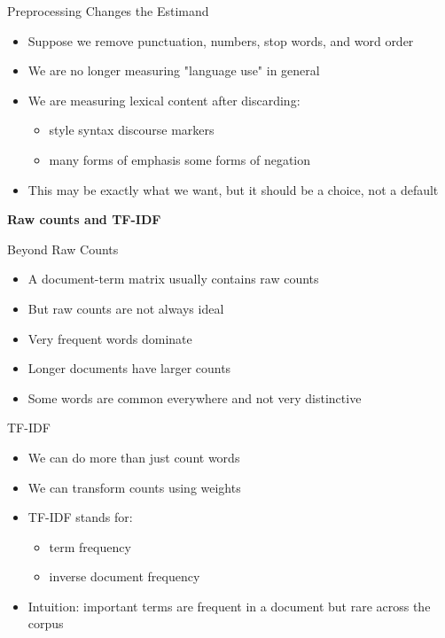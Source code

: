\documentclass[11pt,aspectratio=43]{beamer}
\begin{document}
\begin{frame}{Preprocessing Changes the Estimand}
\begin{itemize}
\item Suppose we remove punctuation, numbers, stop words, and word order
\item We are no longer measuring "language use" in general
\item We are measuring lexical content after discarding:
  \begin{itemize}
  \item style \quad syntax \quad discourse markers
  \item many forms of emphasis \quad some forms of negation
  \end{itemize}
\item This may be exactly what we want, but it should be a choice, not a default
\end{itemize}
\end{frame}

\begin{frame}[plain]
  \centering
  \vfill
  {\LARGE\bfseries
   Raw counts and TF-IDF \par}
  \vfill
\end{frame}


\begin{frame}{Beyond Raw Counts}
\begin{itemize}
\item A document-term matrix usually contains raw counts
\item But raw counts are not always ideal
\item Very frequent words dominate
\item Longer documents have larger counts
\item Some words are common everywhere and not very distinctive
\end{itemize}
\end{frame}

\begin{frame}{TF-IDF}
\begin{itemize}
\item We can do more than just count words
\item We can transform counts using weights
\item TF-IDF stands for:
  \begin{itemize}
  \item term frequency
  \item inverse document frequency
  \end{itemize}
\item Intuition: important terms are frequent in a document but rare across the corpus
\end{itemize}
\end{frame}
\end{document}
